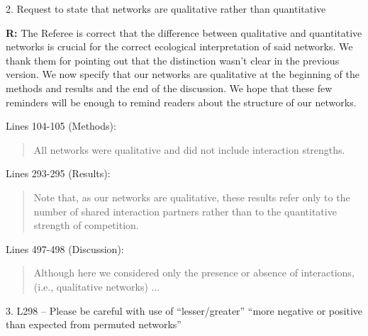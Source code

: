 \documentclass[12pt]{letter}
\begin{document}


	2. Request to state that networks are qualitative rather than quantitative 

		\textbf{R:} The Referee is correct that the difference between qualitative and quantitative networks is crucial for the correct ecological interpretation of said networks. We thank them for pointing out that the distinction wasn't clear in the previous version. We now specify that our networks are qualitative at the beginning of the methods and results and the end of the discussion. We hope that these few reminders will be enough to remind readers about the structure of our networks.

		Lines 104-105 (Methods):

		\begin{quotation}

			All networks were qualitative and did not include interaction strengths.

		\end{quotation}


		Lines 293-295 (Results):

		\begin{quotation}

			Note that, as our networks 
		    are qualitative, these results refer only to the number of shared interaction
	    	partners rather than to the quantitative strength of competition.

    	\end{quotation}


    	Lines 497-498 (Discussion):

    	\begin{quotation}

		  Although here we considered only the presence or absence of interactions,
		  (i.e., qualitative networks) ...

    	\end{quotation}


	3. L298 – Please be careful with use of “lesser/greater” “more negative or positive than expected from permuted networks” 
\end{document}
